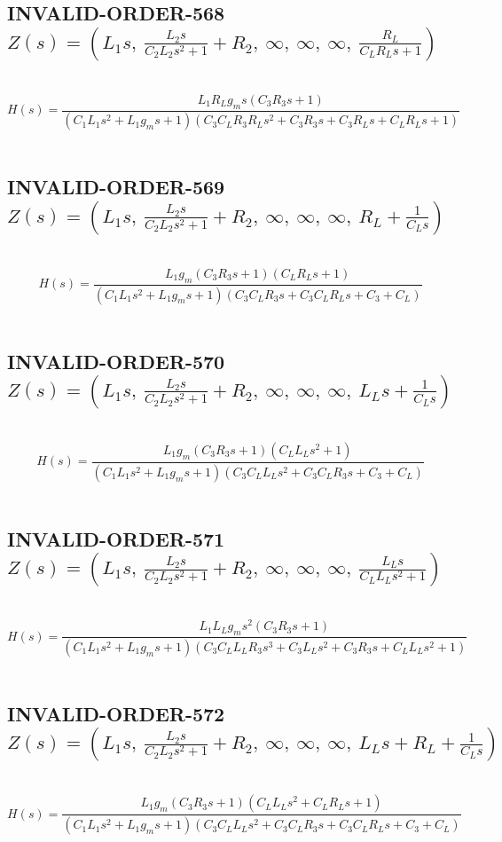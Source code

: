 \documentclass{article}
\begin{document}
\subsection{INVALID-ORDER-568 $Z(s) = \left( L_{1} s, \  \frac{L_{2} s}{C_{2} L_{2} s^{2} + 1} + R_{2}, \  \infty, \  \infty, \  \infty, \  \frac{R_{L}}{C_{L} R_{L} s + 1}\right)$ } \ 
\textbf{\[H(s) = \frac{L_{1} R_{L} g_{m} s \left(C_{3} R_{3} s + 1\right)}{\left(C_{1} L_{1} s^{2} + L_{1} g_{m} s + 1\right) \left(C_{3} C_{L} R_{3} R_{L} s^{2} + C_{3} R_{3} s + C_{3} R_{L} s + C_{L} R_{L} s + 1\right)}\] } \ 
\subsection{INVALID-ORDER-569 $Z(s) = \left( L_{1} s, \  \frac{L_{2} s}{C_{2} L_{2} s^{2} + 1} + R_{2}, \  \infty, \  \infty, \  \infty, \  R_{L} + \frac{1}{C_{L} s}\right)$ } \ 
\textbf{\[H(s) = \frac{L_{1} g_{m} \left(C_{3} R_{3} s + 1\right) \left(C_{L} R_{L} s + 1\right)}{\left(C_{1} L_{1} s^{2} + L_{1} g_{m} s + 1\right) \left(C_{3} C_{L} R_{3} s + C_{3} C_{L} R_{L} s + C_{3} + C_{L}\right)}\] } \ 
\subsection{INVALID-ORDER-570 $Z(s) = \left( L_{1} s, \  \frac{L_{2} s}{C_{2} L_{2} s^{2} + 1} + R_{2}, \  \infty, \  \infty, \  \infty, \  L_{L} s + \frac{1}{C_{L} s}\right)$ } \ 
\textbf{\[H(s) = \frac{L_{1} g_{m} \left(C_{3} R_{3} s + 1\right) \left(C_{L} L_{L} s^{2} + 1\right)}{\left(C_{1} L_{1} s^{2} + L_{1} g_{m} s + 1\right) \left(C_{3} C_{L} L_{L} s^{2} + C_{3} C_{L} R_{3} s + C_{3} + C_{L}\right)}\] } \ 
\subsection{INVALID-ORDER-571 $Z(s) = \left( L_{1} s, \  \frac{L_{2} s}{C_{2} L_{2} s^{2} + 1} + R_{2}, \  \infty, \  \infty, \  \infty, \  \frac{L_{L} s}{C_{L} L_{L} s^{2} + 1}\right)$ } \ 
\textbf{\[H(s) = \frac{L_{1} L_{L} g_{m} s^{2} \left(C_{3} R_{3} s + 1\right)}{\left(C_{1} L_{1} s^{2} + L_{1} g_{m} s + 1\right) \left(C_{3} C_{L} L_{L} R_{3} s^{3} + C_{3} L_{L} s^{2} + C_{3} R_{3} s + C_{L} L_{L} s^{2} + 1\right)}\] } \ 
\subsection{INVALID-ORDER-572 $Z(s) = \left( L_{1} s, \  \frac{L_{2} s}{C_{2} L_{2} s^{2} + 1} + R_{2}, \  \infty, \  \infty, \  \infty, \  L_{L} s + R_{L} + \frac{1}{C_{L} s}\right)$ } \ 
\textbf{\[H(s) = \frac{L_{1} g_{m} \left(C_{3} R_{3} s + 1\right) \left(C_{L} L_{L} s^{2} + C_{L} R_{L} s + 1\right)}{\left(C_{1} L_{1} s^{2} + L_{1} g_{m} s + 1\right) \left(C_{3} C_{L} L_{L} s^{2} + C_{3} C_{L} R_{3} s + C_{3} C_{L} R_{L} s + C_{3} + C_{L}\right)}\] } \ 
\end{document}
